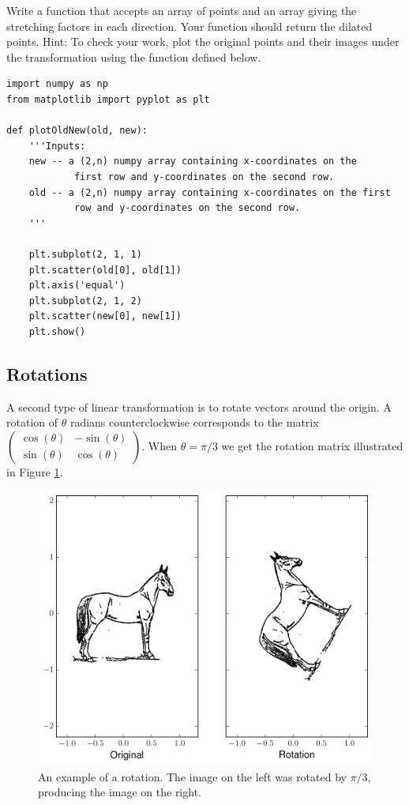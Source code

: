 \begin{problem}\label{prob:dilation}
Write a function that accepts an array of points and an array giving the stretching factors in each direction. 
Your function should return the dilated points. 
Hint: To check your work, plot the original points and their images under the transformation using the function  defined below.
\begin{lstlisting}
import numpy as np
from matplotlib import pyplot as plt

def plotOldNew(old, new):
    '''Inputs:
    new -- a (2,n) numpy array containing x-coordinates on the 
            first row and y-coordinates on the second row.
    old -- a (2,n) numpy array containing x-coordinates on the first
            row and y-coordinates on the second row.
    '''
            
    plt.subplot(2, 1, 1)
    plt.scatter(old[0], old[1])
    plt.axis('equal')
    plt.subplot(2, 1, 2)
    plt.scatter(new[0], new[1])
    plt.show()
\end{lstlisting}
\end{problem}

\subsection*{Rotations} %

A second type of linear transformation is to rotate vectors around the origin. 
A rotation of $\theta$ radians counterclockwise corresponds to the matrix $\begin{pmatrix}
\cos(\theta) & -\sin(\theta) \\
\sin(\theta) & \cos(\theta)
\end{pmatrix}.$ 
When $\theta = \pi/3$ we get the rotation matrix illustrated in Figure \ref{fig:rotate}.

\begin{figure}
\includegraphics[width=\textwidth]{rotate.pdf}
\caption{An example of a rotation.
The image on the left was rotated by $\pi/3$, producing the image on the right.}
\label{fig:rotate}
\end{figure}

